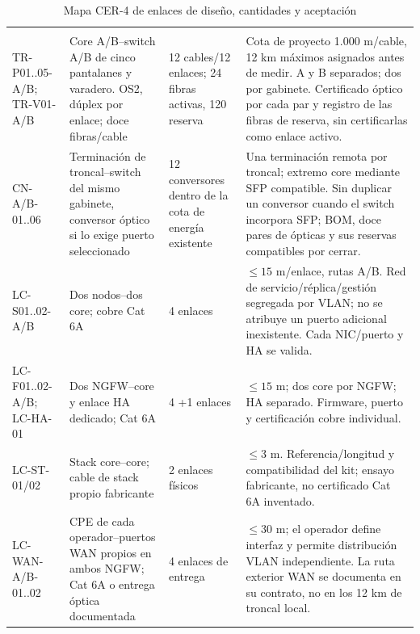 \begin{paginaHorizontalSynaptix}
\begingroup
\setlength{\tabcolsep}{3pt}
\begin{longtable}{L{\dimexpr.17\tabcolsep\relax}L{\dimexpr.29\tabcolsep\relax}L{\dimexpr.15\tabcolsep\relax}L{\dimexpr.39\tabcolsep\relax}}
\caption{Mapa CER-4 de enlaces de diseño, cantidades y aceptación}\label{tab:cer4-enlaces}\\\hline
{} &  &  & \\\hline\endfirsthead
\hline{} &  &  & \\\hline\endhead
TR-P01..05-A/B; TR-V01-A/B & Core A/B--switch A/B de cinco pantalanes y varadero. OS2, dúplex por enlace; doce fibras/cable & 12 cables/12 enlaces; 24 fibras activas, 120 reserva & Cota de proyecto 1.000 m/cable, 12 km máximos asignados antes de medir. A y B separados; dos por gabinete. Certificado óptico por cada par y registro de las fibras de reserva, sin certificarlas como enlace activo.\\\hline
CN-A/B-01..06 & Terminación de troncal--switch del mismo gabinete, conversor óptico si lo exige puerto seleccionado & 12 conversores dentro de la cota de energía existente & Una terminación remota por troncal; extremo core mediante SFP compatible. Sin duplicar un conversor cuando el switch incorpora SFP; BOM, doce pares de ópticas y sus reservas compatibles por cerrar.\\\hline
LC-S01..02-A/B & Dos nodos--dos core; cobre Cat 6A & 4 enlaces & $\leq15$ m/enlace, rutas A/B. Red de servicio/réplica/gestión segregada por VLAN; no se atribuye un puerto adicional inexistente. Cada NIC/puerto y HA se valida.\\\hline
LC-F01..02-A/B; LC-HA-01 & Dos NGFW--core y enlace HA dedicado; Cat 6A & 4 +1 enlaces & $\leq15$ m; dos core por NGFW; HA separado. Firmware, puerto y certificación cobre individual.\\\hline
LC-ST-01/02 & Stack core--core; cable de stack propio fabricante & 2 enlaces físicos & $\leq3$ m. Referencia/longitud y compatibilidad del kit; ensayo fabricante, no certificado Cat 6A inventado.\\\hline
LC-WAN-A/B-01..02 & CPE de cada operador--puertos WAN propios en ambos NGFW; Cat 6A o entrega óptica documentada & 4 enlaces de entrega & $\leq30$ m; el operador define interfaz y permite distribución VLAN independiente. La ruta exterior WAN se documenta en su contrato, no en los 12 km de troncal local.\\\hline

\end{longtable}
\end{paginaHorizontalSynaptix}
